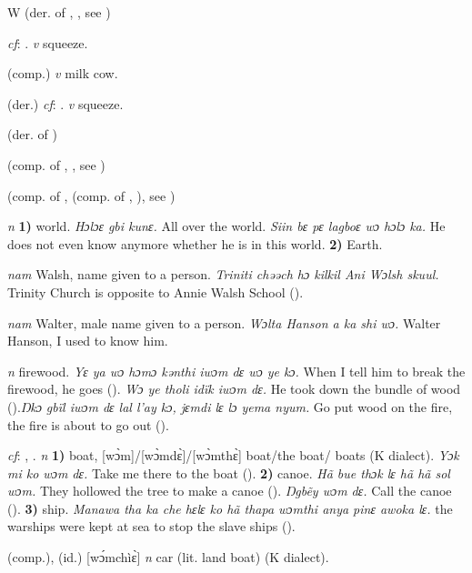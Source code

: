 \begin{letter}{W}
 (der. of , , see ) 

 \textit{cf}: . \textit{v} squeeze.

 (comp.) \textit{v} milk cow.

 (der.) \textit{cf}: . \textit{v} squeeze.

 (der. of ) 

 (comp. of , , see ) 

 (comp. of ,  (comp. of , ), see ) 

 \textit{n} \textbf{1)} world. \textit{Hɔlɔɛ gbi kunɛ.} All over the world. \textit{Siin bɛ pɛ lagboɛ wɔ hɔlɔ ka.} He does not even know anymore whether he is in this world. \textbf{2)} Earth. 

 \textit{nam} Walsh, name given to a person. \textit{Triniti chəəch hɔ kilkil Ani Wɔlsh skuul.} Trinity Church is opposite to Annie Walsh School (\citealt{Pichl1967}). 

 \textit{nam} Walter, male name given to a person. \textit{Wɔlta Hanson a ka shi wɔ.} Walter Hanson, I used to know him.

 \textit{n} firewood. \textit{Yɛ ya wɔ hɔmɔ kənthi iwɔm dɛ wɔ ye kɔ.} When I tell him to break the firewood, he goes (\citealt{Pichl1967}). \textit{Wɔ ye tholi idïk iwɔm dɛ.} He took down the bundle of wood (\citealt{Pichl1967}).\textit{Ŋkɔ gbïl iwɔm dɛ lal l'ay kɔ, jɛmdi lɛ lɔ yema nyum.} Go put wood on the fire, the fire is about to go out (\citealt{Pichl1967}).

 \textit{cf}: , . \textit{n} \textbf{1)} boat, [wɔ̀m]/[wɔ̀mdɛ̀]/[wɔ̀mthɛ̀] boat/the boat/ boats (K dialect). \textit{Yɔk mi ko wɔm dɛ.} Take me there to the boat (\citealt{Pichl1967}). \textbf{2)} canoe. \textit{ Hã bue thɔk lɛ hã hã sol wɔm.} They hollowed the tree to make a canoe (\citealt{Pichl1967}). \textit{Ŋgbẽy wɔm dɛ.} Call the canoe (\citealt{Pichl1967}). \textbf{3)} ship. \textit{Manawa tha ka che hɛlɛ ko hã thapa wɔmthi anya pinɛ awoka lɛ.} the warships were kept at sea to stop the slave ships (\citealt{Pichl1967}). 

 (comp.), (id.) [wɔ́mchìɛ̀] \textit{n} car (lit. land boat) (K dialect). 


\end{letter}
